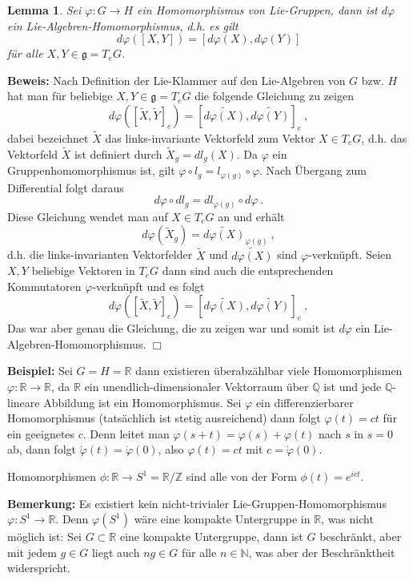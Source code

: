 \documentclass[12pt,a4paper]{article}
\def\R{\mathbb{R}}
\def\N{\mathbb{N}}
\def\Z{\mathbb{Z}}
\def\Q{\mathbb{Q}}
\def\g{\mathfrak{g}}
\newtheorem{Lemma}{Lemma}[section]
\def\proof{\noindent\textbf{Beweis:}\quad}
\def\qed{\quad\hfill\ensuremath{\Box}}
\begin{document}
\begin{Lemma}
Sei $\varphi : G\rightarrow H$ ein Homomorphismus von Lie-Gruppen, dann ist $d\varphi$ ein
Lie-Algebren-Homomorphismus, d.h. es gilt
$$
d\varphi ([X, Y]) = [d\varphi (X), d\varphi (Y)]
$$
f\"ur alle $X, Y \in \g = T_eG$.
\end{Lemma}
\proof
Nach Definition der Lie-Klammer auf den Lie-Algebren von $G$ bzw. $H$ hat man f\"ur
beliebige  $X,Y \in \g= T_eG$ die folgende Gleichung zu zeigen
$$
d\varphi ([\tilde X,\tilde Y]_e) = [\widetilde{d\varphi(X)},\widetilde{d\varphi(Y)}]_e \ ,
$$
dabei bezeichnet $\tilde X$ das links-invariante Vektorfeld zum Vektor $X\in T_e G $,
d.h. das Vektorfeld $\tilde X$ ist definiert durch $\tilde X_g = dl_g (X)$. Da $\varphi$ ein Gruppenhomomorphismus ist, gilt
$\varphi \circ l_g = l_{\varphi(g)} \circ \varphi$.  Nach \"Ubergang zum Differential
folgt daraus
$$
d\varphi \circ dl_g = dl_{\varphi(g)} \circ d\varphi \ .
$$
Diese Gleichung wendet man auf $X\in T_eG$ an und erh\"alt
$$
d\varphi (\tilde X_g) = \widetilde{d\varphi(X)}_{\varphi(g)} \ ,
$$
d.h. die links-invarianten Vektorfelder $\tilde X$ und $\widetilde{d\varphi(X)}$
sind $\varphi$-verkn\"upft. Seien $X,Y$ beliebige Vektoren in $T_eG$ dann sind auch die entsprechenden
Kommutatoren $\varphi$-verkn\"upft und es folgt
$$
d\varphi ([\tilde X, \tilde Y]_e) = [\widetilde{d\varphi(X)}, \widetilde{d\varphi(Y)}]_e \ ,
$$
Das war aber genau die Gleichung, die zu zeigen war und somit ist $d\varphi$
ein Lie-Algebren-Homomorphismus.
\qed

\bigskip

{\bf Beispiel:}
Sei $G=H=\R$ dann existieren \"uberabz\"ahlbar viele Homomorphismen $\varphi : \R \rightarrow \R$,
da $\R$ ein unendlich-dimensionaler Vektorraum \"uber $\Q$ ist und jede $\Q$-lineare Abbildung
ist ein Homomorphismus. Sei $\varphi$ ein differenzierbarer Homomorphismus (tats\"achlich ist
stetig ausreichend) dann folgt $\varphi(t) = c t$ f\"ur ein geeignetes $c$. Denn leitet man
$\varphi(s+t)=\varphi(s) + \varphi(t)$ nach $s$ in $s=0$ ab, dann folgt $\dot \varphi(t) = \dot \varphi(0)$,
also $\varphi(t) = ct$ mit $c= \dot \varphi(0)$.

\medskip

Homomorphismen $\phi: \R \rightarrow S^1 = \R / \Z$ sind alle von der Form $\phi(t) = e^{ict}$.

\bigskip

{\bf Bemerkung:} Es existiert kein nicht-trivialer Lie-Gruppen-Homomorphismus $\varphi : S^1 \rightarrow \R$.
Denn $\varphi(S^1)$ w\"are eine kompakte Untergruppe in $\R$, was nicht m\"oglich ist: Sei $G\subset \R$
eine kompakte Untergruppe, dann ist $G$ beschr\"ankt, aber mit jedem $g\in G$ liegt auch $n g \in G$ f\"ur
alle $n \in \N$, was aber der Beschr\"anktheit widerspricht.
\end{document}
